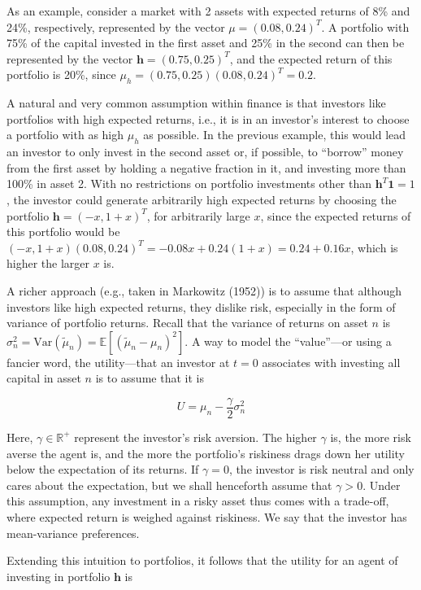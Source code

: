 \documentclass{article}
\begin{document}
As an example, consider a market with 2 assets with expected returns of 8\% and 24\%, respectively, represented by the vector $\mu = (0.08, 0.24)^T$. A portfolio with 75\% of the capital invested in the first asset and 25\% in the second can then be represented by the vector $\mathbf{h} = (0.75, 0.25)^T$, and the expected return of this portfolio is 20\%, since $\mu_h = (0.75, 0.25)(0.08, 0.24)^T = 0.2$.

A natural and very common assumption within finance is that investors like portfolios with high expected returns, i.e., it is in an investor's interest to choose a portfolio with as high $\mu_h$ as possible. In the previous example, this would lead an investor to only invest in the second asset or, if possible, to ``borrow'' money from the first asset by holding a negative fraction in it, and investing more than 100\% in asset 2. With no restrictions on portfolio investments other than $\mathbf{h}^T \mathbf{1} = 1$, the investor could generate arbitrarily high expected returns by choosing the portfolio $\mathbf{h} = (-x, 1 + x)^T$, for arbitrarily large $x$, since the expected returns of this portfolio would be $(-x, 1 + x)(0.08, 0.24)^T = -0.08x + 0.24(1 + x) = 0.24 + 0.16x$, which is higher the larger $x$ is.

A richer approach (e.g., taken in Markowitz (1952)) is to assume that although investors like high expected returns, they dislike risk, especially in the form of variance of portfolio returns. Recall that the variance of returns on asset $n$ is $\sigma_n^2 = \text{Var}(\tilde{\mu}_n) = \mathbb{E}[({\tilde{\mu}_n - \mu_n})^2]$. A way to model the ``value''---or using a fancier word, the utility---that an investor at $t = 0$ associates with investing all capital in asset $n$ is to assume that it is

\[
U = \mu_n - \frac{\gamma}{2} \sigma_n^2
\]

Here, $\gamma \in \mathbb{R}^+$ represent the investor's risk aversion. The higher $\gamma$ is, the more risk averse the agent is, and the more the portfolio's riskiness drags down her utility below the expectation of its returns. If $\gamma = 0$, the investor is risk neutral and only cares about the expectation, but we shall henceforth assume that $\gamma > 0$. Under this assumption, any investment in a risky asset thus comes with a trade-off, where expected return is weighed against riskiness. We say that the investor has mean-variance preferences.

Extending this intuition to portfolios, it follows that the utility for an agent of investing in portfolio $\mathbf{h}$ is
\end{document}
